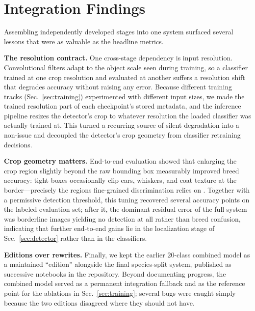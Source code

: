 \section{Integration Findings}
\label{sec:integration}

Assembling independently developed stages into one system surfaced several
lessons that were as valuable as the headline metrics.

\textbf{The resolution contract.} One cross-stage dependency is input
resolution. Convolutional filters adapt to the object scale seen during
training, so a classifier trained at one crop resolution and evaluated at
another suffers a resolution shift that degrades accuracy without raising any
error. Because different training tracks (Sec.~\ref{sec:training})
experimented with different input sizes, we made the trained resolution part
of each checkpoint's stored metadata, and the inference pipeline resizes the
detector's crop to whatever resolution the loaded classifier was actually
trained at. This turned a recurring source of silent degradation into a
non-issue and decoupled the detector's crop geometry from classifier
retraining decisions.

\textbf{Crop geometry matters.} End-to-end evaluation showed that enlarging
the crop region slightly beyond the raw bounding box measurably improved
breed accuracy: tight boxes occasionally clip ears, whiskers, and coat
texture at the border---precisely the regions fine-grained discrimination
relies on \cite{zhang2014part}. Together with a permissive detection
threshold, this tuning recovered several accuracy points on the labeled
evaluation set; after it, the dominant residual error of the full system was
borderline images yielding no detection at all rather than breed confusion,
indicating that further end-to-end gains lie in the localization stage of
Sec.~\ref{sec:detector} rather than in the classifiers.

\textbf{Editions over rewrites.} Finally, we kept the earlier 20-class
combined model as a maintained ``edition'' alongside the final species-split
system, published as successive notebooks in the repository. Beyond
documenting progress, the combined model served as a permanent integration
fallback and as the reference point for the ablations in
Sec.~\ref{sec:training}; several bugs were caught simply because the two
editions disagreed where they should not have.